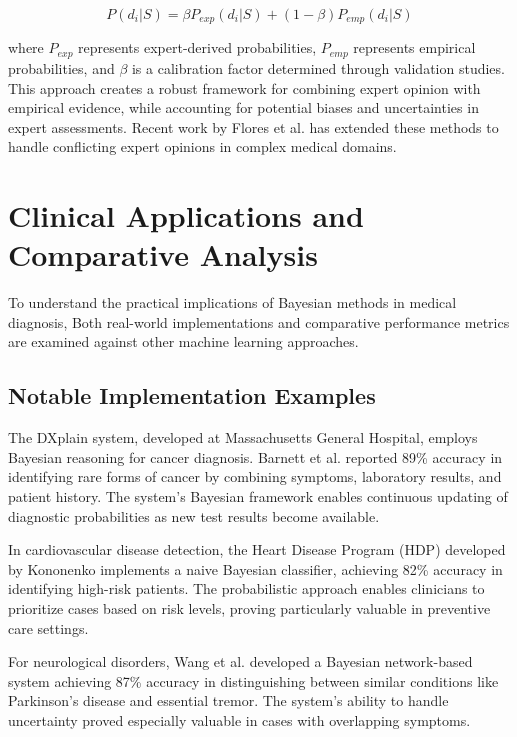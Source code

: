 \documentclass[3p,times,procedia]{elsarticle}
\begin{document}
\begin{equation}
P(d_i|S) = \beta P_{exp}(d_i|S) + (1-\beta)P_{emp}(d_i|S)
\end{equation}

where $P_{exp}$ represents expert-derived probabilities, $P_{emp}$ represents
empirical probabilities, and $\beta$ is a calibration factor determined through
validation studies. This approach creates a robust framework for combining
expert opinion with empirical evidence, while accounting for potential biases
and uncertainties in expert assessments. Recent work by Flores et al. \cite{Flores2011} has
extended these methods to handle conflicting expert opinions in complex medical
domains.

\section{Clinical Applications and Comparative Analysis}
To understand the practical implications of Bayesian methods in medical diagnosis,
Both real-world implementations and comparative performance metrics are examined
against other machine learning approaches.

\subsection{Notable Implementation Examples}
The DXplain system, developed at Massachusetts General Hospital, employs Bayesian
reasoning for cancer diagnosis. Barnett et al. \cite{Barnett2011} reported 89\% accuracy in
identifying rare forms of cancer by combining symptoms, laboratory results, and
patient history. The system's Bayesian framework enables continuous updating of
diagnostic probabilities as new test results become available.

In cardiovascular disease detection, the Heart Disease Program (HDP) developed
by Kononenko \cite{Kononenko1993} implements a naive Bayesian classifier, achieving 82\%
accuracy in identifying high-risk patients. The probabilistic approach enables
clinicians to prioritize cases based on risk levels, proving particularly
valuable in preventive care settings.

For neurological disorders, Wang et al. \cite{Wang2019} developed a Bayesian network-based
system achieving 87\% accuracy in distinguishing between similar conditions like
Parkinson's disease and essential tremor. The system's ability to handle
uncertainty proved especially valuable in cases with overlapping symptoms.
\end{document}
